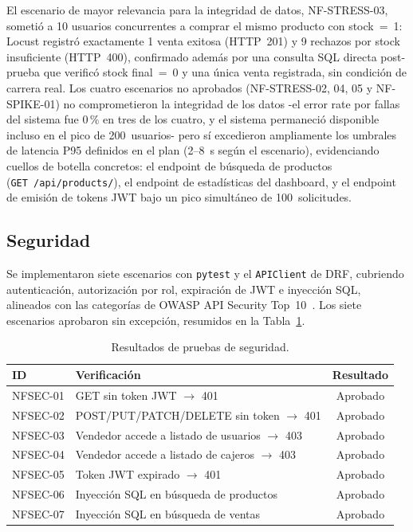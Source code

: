 \documentclass[conference]{IEEEtran}
\begin{document}
El escenario de mayor relevancia para la integridad de datos, NF-STRESS-03, sometió a 10 usuarios concurrentes a comprar el mismo producto con stock~=~1: Locust registró exactamente 1 venta exitosa (HTTP~201) y 9 rechazos por stock insuficiente (HTTP~400), confirmado además por una consulta SQL directa post-prueba que verificó stock final~=~0 y una única venta registrada, sin condición de carrera real. Los cuatro escenarios no aprobados (NF-STRESS-02, 04, 05 y NF-SPIKE-01) no comprometieron la integridad de los datos -el error rate por fallas del sistema fue 0\,\% en tres de los cuatro, y el sistema permaneció disponible incluso en el pico de 200~usuarios- pero sí excedieron ampliamente los umbrales de latencia P95 definidos en el plan (2--8~s según el escenario), evidenciando cuellos de botella concretos: el endpoint de búsqueda de productos (\texttt{GET~/api/products/}), el endpoint de estadísticas del dashboard, y el endpoint de emisión de tokens JWT bajo un pico simultáneo de 100~solicitudes.

\subsection{Seguridad}

Se implementaron siete escenarios con \texttt{pytest} y el \texttt{APIClient} de DRF, cubriendo autenticación, autorización por rol, expiración de JWT e inyección SQL, alineados con las categorías de OWASP API Security Top~10~\cite{owaspapi2023}. Los siete escenarios aprobaron sin excepción, resumidos en la Tabla~\ref{tab:sec}.

\begin{table}[htbp]
  \caption{Resultados de pruebas de seguridad.}
  \label{tab:sec}
  \centering
  \footnotesize
  \begin{tabular}{l p{4.6cm} c}
    \toprule
    \textbf{ID} & \textbf{Verificación} & \textbf{Resultado} \\
    \midrule
    NFSEC-01 & GET sin token JWT $\rightarrow$ 401 & Aprobado \\
    NFSEC-02 & POST/PUT/PATCH/DELETE sin token $\rightarrow$ 401 & Aprobado \\
    NFSEC-03 & Vendedor accede a listado de usuarios $\rightarrow$ 403 & Aprobado \\
    NFSEC-04 & Vendedor accede a listado de cajeros $\rightarrow$ 403 & Aprobado \\
    NFSEC-05 & Token JWT expirado $\rightarrow$ 401 & Aprobado \\
    NFSEC-06 & Inyección SQL en búsqueda de productos & Aprobado \\
    NFSEC-07 & Inyección SQL en búsqueda de ventas & Aprobado \\
    \bottomrule
  \end{tabular}
\end{table}
\end{document}

